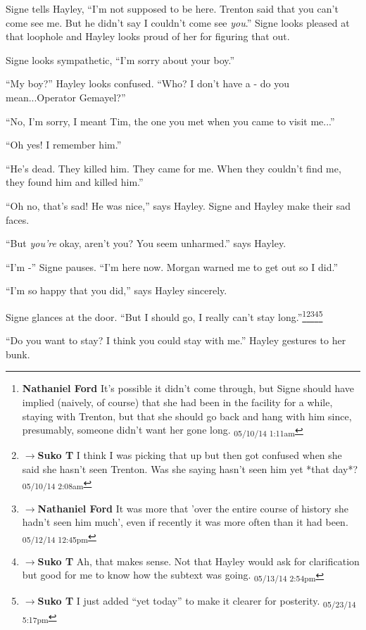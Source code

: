 Signe tells Hayley, ``I'm not supposed to be here.  Trenton said that you can't come see me.  But he didn't say I couldn't come see \textit{you}.''  Signe looks pleased at that loophole and Hayley looks proud of her for figuring that out.  

Signe looks sympathetic, ``I'm sorry about your boy.''

``My boy?'' Hayley looks confused.  ``Who?  I don't have a - do you mean...Operator Gemayel?''  

``No, I'm sorry, I meant Tim, the one you met when you came to visit me...''

``Oh yes!  I remember him.''

``He's dead.  They killed him.  They came for me.  When they couldn't find me, they found him and killed him.'' 

``Oh no, that's sad!  He was nice,'' says Hayley.  Signe and Hayley make their sad faces.

``But \textit{you're} okay, aren't you?  You seem unharmed.'' says Hayley.

``I'm -'' Signe pauses.  ``I'm here now.  Morgan warned me to get out so I did.'' 

``I'm so happy that you did,'' says Hayley sincerely.

Signe glances at the door.  ``But I should go, I really can't stay long.''\footnote{\textbf{Nathaniel Ford }It's possible it didn't come through, but Signe should have implied (naively, of course) that she had been in the facility for a while, staying with Trenton, but that she should go back and hang with him since, presumably, someone didn't want her gone long. \textsubscript{05/10/14 1:11am}}\footnote{$\rightarrow$\textbf{Suko T }I think I was picking that up but then got confused when she said she hasn't seen Trenton.  Was she saying hasn't seen him yet *that day*? \textsubscript{05/10/14 2:08am}}\footnote{$\rightarrow$\textbf{Nathaniel Ford }It was more that 'over the entire course of history she hadn't seen him much', even if recently it was more often than it had been. \textsubscript{05/12/14 12:45pm}}\footnote{$\rightarrow$\textbf{Suko T }Ah, that makes sense.  Not that Hayley would ask for clarification but good for me to know how the subtext was going. \textsubscript{05/13/14 2:54pm}}\footnote{$\rightarrow$\textbf{Suko T }I just added ``yet today'' to make it clearer for posterity. \textsubscript{05/23/14 5:17pm}}

``Do you want to stay?  I think you could stay with me.''  Hayley gestures to her bunk.

